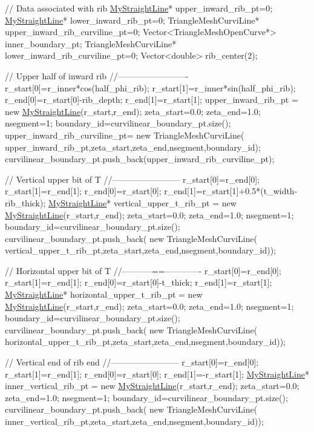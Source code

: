 \begin{DoxyCodeInclude}
 \textcolor{comment}{// Data associated with rib}
 \hyperlink{classMyStraightLine}{MyStraightLine}* upper\_inward\_rib\_pt=0;
 \hyperlink{classMyStraightLine}{MyStraightLine}* lower\_inward\_rib\_pt=0;
 TriangleMeshCurviLine* upper\_inward\_rib\_curviline\_pt=0;
 Vector<TriangleMeshOpenCurve*> inner\_boundary\_pt;
 TriangleMeshCurviLine* lower\_inward\_rib\_curviline\_pt=0;
 Vector<double> rib\_center(2);

 \textcolor{comment}{// Upper half of inward rib}
 \textcolor{comment}{//-------------------------}
 r\_start[0]=r\_inner*cos(half\_phi\_rib);
 r\_start[1]=r\_inner*sin(half\_phi\_rib);
 r\_end[0]=r\_start[0]-rib\_depth;
 r\_end[1]=r\_start[1];
 upper\_inward\_rib\_pt = \textcolor{keyword}{new} \hyperlink{classMyStraightLine}{MyStraightLine}(r\_start,r\_end);
 zeta\_start=0.0;
 zeta\_end=1.0;
 nsegment=1;
 boundary\_id=curvilinear\_boundary\_pt.size();
 upper\_inward\_rib\_curviline\_pt=
  \textcolor{keyword}{new} TriangleMeshCurviLine(
   upper\_inward\_rib\_pt,zeta\_start,zeta\_end,nsegment,boundary\_id);
 curvilinear\_boundary\_pt.push\_back(upper\_inward\_rib\_curviline\_pt);

 \textcolor{comment}{// Vertical upper bit of T}
 \textcolor{comment}{//------------------------}
 r\_start[0]=r\_end[0];
 r\_start[1]=r\_end[1];
 r\_end[0]=r\_start[0];
 r\_end[1]=r\_start[1]+0.5*(t\_width-rib\_thick);
 \hyperlink{classMyStraightLine}{MyStraightLine}* vertical\_upper\_t\_rib\_pt = \textcolor{keyword}{new} \hyperlink{classMyStraightLine}{MyStraightLine}(r\_start,r\_end);
 zeta\_start=0.0;
 zeta\_end=1.0;
 nsegment=1;
 boundary\_id=curvilinear\_boundary\_pt.size();
 curvilinear\_boundary\_pt.push\_back(
  \textcolor{keyword}{new} TriangleMeshCurviLine(
   vertical\_upper\_t\_rib\_pt,zeta\_start,zeta\_end,nsegment,boundary\_id));


 \textcolor{comment}{// Horizontal upper bit of T}
 \textcolor{comment}{//-----------==-------------}
 r\_start[0]=r\_end[0];
 r\_start[1]=r\_end[1];
 r\_end[0]=r\_start[0]-t\_thick;
 r\_end[1]=r\_start[1];
 \hyperlink{classMyStraightLine}{MyStraightLine}* horizontal\_upper\_t\_rib\_pt = \textcolor{keyword}{new} \hyperlink{classMyStraightLine}{MyStraightLine}(r\_start,r\_end);
 zeta\_start=0.0;
 zeta\_end=1.0;
 nsegment=1;
 boundary\_id=curvilinear\_boundary\_pt.size();
 curvilinear\_boundary\_pt.push\_back(
  \textcolor{keyword}{new} TriangleMeshCurviLine(
   horizontal\_upper\_t\_rib\_pt,zeta\_start,zeta\_end,nsegment,boundary\_id));

 \textcolor{comment}{// Vertical end of rib end}
 \textcolor{comment}{//------------------------}
 r\_start[0]=r\_end[0];
 r\_start[1]=r\_end[1];
 r\_end[0]=r\_start[0];
 r\_end[1]=-r\_start[1];
 \hyperlink{classMyStraightLine}{MyStraightLine}* inner\_vertical\_rib\_pt = \textcolor{keyword}{new} \hyperlink{classMyStraightLine}{MyStraightLine}(r\_start,r\_end);
 zeta\_start=0.0;
 zeta\_end=1.0;
 nsegment=1;
 boundary\_id=curvilinear\_boundary\_pt.size();
 curvilinear\_boundary\_pt.push\_back(
  \textcolor{keyword}{new} TriangleMeshCurviLine(
   inner\_vertical\_rib\_pt,zeta\_start,zeta\_end,nsegment,boundary\_id));
 


\end{DoxyCodeInclude}
